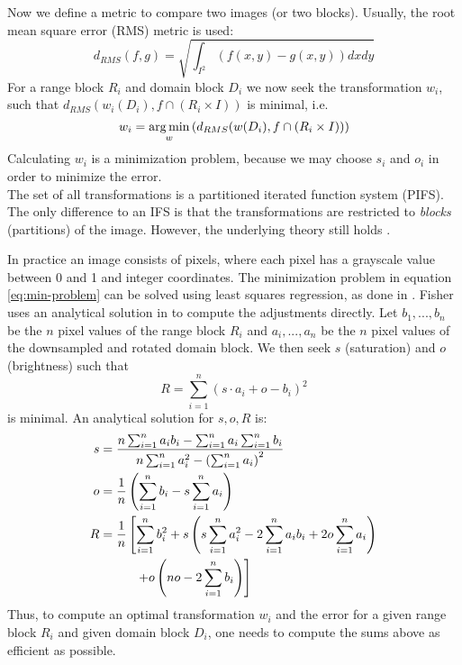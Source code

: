 Now we define a metric to compare two images (or two blocks). Usually, the root mean square error (RMS) metric is used:
$$
d_{RMS}(f,g) = \sqrt{\int_{I^2} (f(x,y)-g(x,y))dxdy}
$$
For a range block $R_i$ and domain block $D_i$ we now seek the transformation $w_i$, such that $d_{RMS}(w_i(D_i), f \cap (R_i \times I))$ is minimal, i.e.
\begin{equation} \label{eq:min-problem}
    w_i = \operatorname*{arg\,min}_{w} \left( d_{RMS}(w(D_i), f \cap (R_i \times I)) \right)
\end{equation}
Calculating $w_i$ is a minimization problem, because we may choose $s_i$ and $o_i$ in order to minimize the error.\\
The set of all transformations is a partitioned iterated function system (PIFS). The only difference to an IFS is that the transformations are restricted
to \textit{blocks} (partitions) of the image. However, the underlying theory still holds \cite{fisher2012}.

 \label{par-practical-implementation}
In practice an image consists of pixels, where each pixel has a grayscale value between 0 and 1 and integer coordinates.
The minimization problem in equation \ref{eq:min-problem} can be solved using least squares regression, as done in \cite{github-python}.
Fisher uses an analytical solution in \cite{fisher2012} to compute the adjustments directly. Let $b_1, ..., b_n$ be the $n$ pixel values of the range block $R_i$
and $a_i,...,a_n$ be the $n$ pixel values of the downsampled and rotated domain block. We then seek $s$ (saturation) and $o$ (brightness) such that
$$
R = \sum_{i=1}^n (s \cdot a_i + o - b_i)^2
$$
is minimal. An analytical solution for $s,o,R$ is:
\begin{align}
    s &= \frac{n \sum_{i=1}^n a_i b_i - \sum_{i=1}^n a_i \sum_{i=1}^n b_i}{n \sum_{i=1}^n a_i^2 - \left(\sum_{i=1}^n a_i \right)^2} \label{contrast}\\
    o &= \frac{1}{n} \left( \sum_{i=1}^n b_i - s \sum_{i=1}^n a_i \right) \label{brightness}\\
    R &= \frac{1}{n} \left[ \sum_{i=1}^n b_i^2 + s \left( s \sum_{i=1}^n a_i^2 - 2 \sum_{i=1}^n a_i b_i + 2o \sum_{i=1}^n a_i \right) \right. \notag\\
    &\text{\hspace{1cm}} \left. + o \left(no - 2 \sum_{i=1}^n b_i \right)  \right]\label{error}
    \end{align}
Thus, to compute an optimal transformation $w_i$ and the error for a given range block $R_i$ and given domain block $D_i$, one needs to compute the sums above
as efficient as possible.

